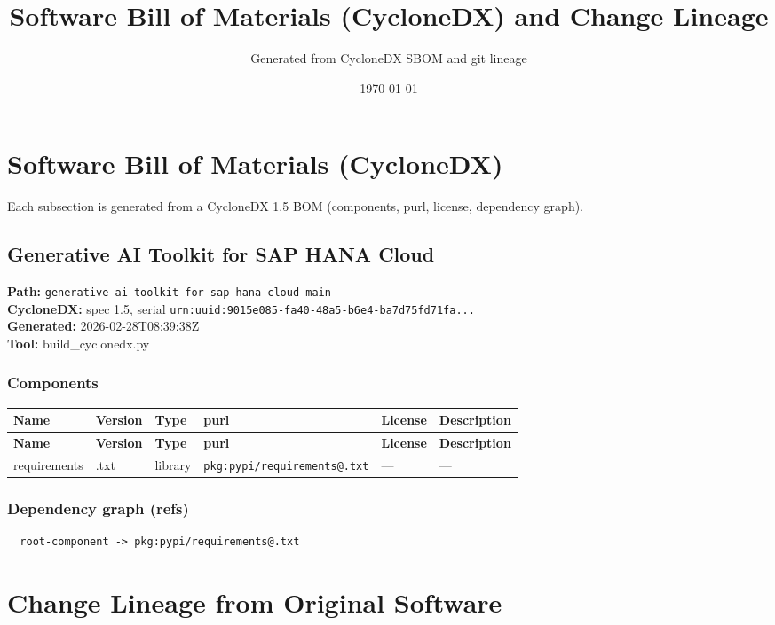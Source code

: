 \documentclass[11pt]{article}
\title{Software Bill of Materials (CycloneDX) and Change Lineage}
\author{Generated from CycloneDX SBOM and git lineage}
\date{\today}
\begin{document}
\maketitle
\tableofcontents
\newpage
\section{Software Bill of Materials (CycloneDX)}
Each subsection is generated from a CycloneDX 1.5 BOM (components, purl, license, dependency graph).

\subsection{Generative AI Toolkit for SAP HANA Cloud}
\textbf{Path:} \texttt{generative-ai-toolkit-for-sap-hana-cloud-main}
\\ \textbf{CycloneDX:} spec 1.5, serial \texttt{urn:uuid:9015e085-fa40-48a5-b6e4-ba7d75fd71fa...}
\\ \textbf{Generated:} 2026-02-28T08:39:38Z
\\ \textbf{Tool:} build\_cyclonedx.py

\subsubsection*{Components}
\begin{longtable}{|l|l|l|p{2.2cm}|l|p{4cm}|}
\hline
\textbf{Name} & \textbf{Version} & \textbf{Type} & \textbf{purl} & \textbf{License} & \textbf{Description} \\
\hline
\endfirsthead
\hline
\textbf{Name} & \textbf{Version} & \textbf{Type} & \textbf{purl} & \textbf{License} & \textbf{Description} \\
\hline
\endhead
requirements & .txt & library & \texttt{pkg:pypi/requirements@.txt} & — & — \\
\hline
\end{longtable}

\subsubsection*{Dependency graph (refs)}
\begin{verbatim}
  root-component -> pkg:pypi/requirements@.txt
\end{verbatim}

\newpage
\section{Change Lineage from Original Software}
\end{document}
